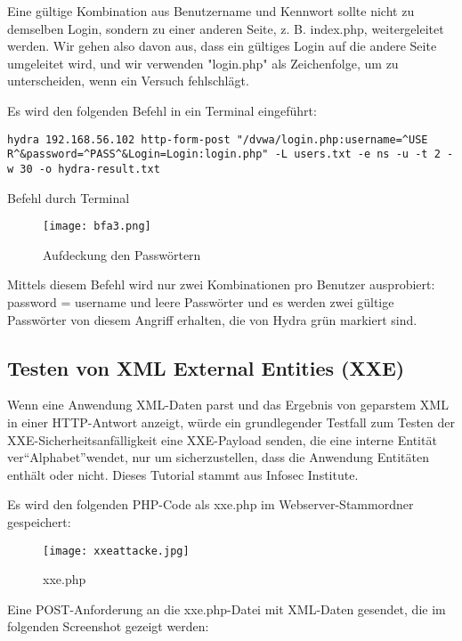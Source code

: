Eine gültige Kombination aus Benutzername und Kennwort sollte nicht zu demselben Login, sondern zu einer anderen Seite, z. B. index.php, weitergeleitet werden. Wir gehen also davon aus, dass ein gültiges Login auf die andere Seite umgeleitet wird, und wir verwenden "login.php" als Zeichenfolge, um zu unterscheiden, wenn ein Versuch fehlschlägt\cite[145]{najera2016kali}.

Es wird den folgenden Befehl in ein Terminal eingeführt\cite[145]{najera2016kali}:

\begin{Listing}[h]
	\begin{lstlisting}
hydra 192.168.56.102 http-form-post "/dvwa/login.php:username=^USE
R^&password=^PASS^&Login=Login:login.php" -L users.txt -e ns -u -t 2 -w 30 -o hydra-result.txt
	\end{lstlisting}
	\caption{Befehl durch Terminal}
\end{Listing}

\begin{figure}[h]
	\centering
	\texttt{[image: bfa3.png]}
	\caption{Aufdeckung den Passwörtern}
\end{figure}

Mittels diesem Befehl wird nur zwei Kombinationen pro Benutzer ausprobiert: password = username und leere Passwörter und es werden zwei gültige Passwörter von diesem Angriff erhalten, die von Hydra grün markiert sind\cite[145]{najera2016kali}.

\subsection{Testen von XML External Entities (XXE)}

Wenn eine Anwendung XML-Daten parst und das Ergebnis von geparstem XML in einer HTTP-Antwort anzeigt, würde ein grundlegender Testfall zum Testen der XXE-Sicherheitsanfälligkeit eine XXE-Payload senden, die eine interne Entität ver"`Alphabet"'wendet, nur um sicherzustellen, dass die Anwendung Entitäten enthält oder nicht. Dieses Tutorial stammt aus Infosec Institute\cite{infosec18}.

Es wird den folgenden PHP-Code als xxe.php im Webserver-Stammordner gespeichert:

\begin{figure}[h]
	\centering
	\texttt{[image: xxeattacke.jpg]}
	\caption{xxe.php}
\end{figure}

Eine POST-Anforderung an die xxe.php-Datei mit XML-Daten gesendet, die im folgenden Screenshot gezeigt werden:

